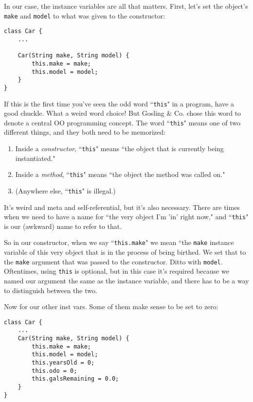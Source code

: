 In our case, the instance variables are all that matters. First, let's set the
object's \texttt{make} and \texttt{model} to what was given to the
constructor:

\begin{Verbatim}[samepage=true,fontsize=\footnotesize,frame=single]
class Car {
    ...

    Car(String make, String model) {
        this.make = make;
        this.model = model;
    }
}
\end{Verbatim}
\normalsize

If this is the first time you've seen the odd word ``\texttt{this}" in a
program, have a good chuckle. What a weird word choice! But Gosling \& Co.
chose this word to denote a central OO programming concept. The word
``\texttt{this}" means one of two different things, and they both need to be
memorized:

\begin{enumerate}
\large
\itemsep.1em
\item Inside a \textit{constructor}, ``\texttt{this}" means ``the object that is
currently being instantiated."
\item Inside a \textit{method}, ``\texttt{this}" means ``the object the
method was called on."
\item (Anywhere else, ``\texttt{this}" is illegal.)
\normalsize
\end{enumerate}

It's weird and meta and self-referential, but it's also necessary. There are
times when we need to have a name for ``the very object I'm 'in' right now,"
and ``\texttt{this}" is our (awkward) name to refer to that.

So in our constructor, when we say ``\texttt{this.make}" we mean ``the
\texttt{make} instance variable of this very object that is in the process of
being birthed. We set that to the \texttt{make} argument that was passed to
the constructor. Ditto with \texttt{model}. Oftentimes, using \texttt{this} is
optional, but in this case it's required because we named our argument the
same as the instance variable, and there has to be a way to distinguish
between the two.

Now for our other inst vars. Some of them make sense to be set to zero:

\begin{Verbatim}[samepage=true,fontsize=\footnotesize,frame=single]
class Car {
    ...
    Car(String make, String model) {
        this.make = make;
        this.model = model;
        this.yearsOld = 0;
        this.odo = 0;
        this.galsRemaining = 0.0;
    }
}
\end{Verbatim}

